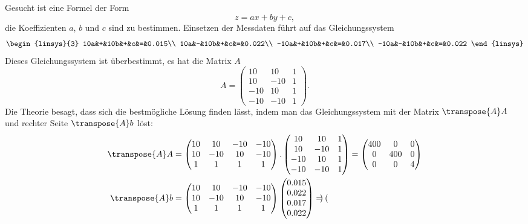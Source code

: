 \begin{loesung}
\begin{teilaufgaben}
\item
Gesucht ist eine Formel der Form
\[
z=ax+by+c,
\]
die Koeffizienten $a$, $b$ und $c$ sind zu bestimmen. Einsetzen der Messdaten
führt auf das Gleichungssystem
\[
\begin{linsys}{3}
 10a&+&10b&+&c&=&0.015\\
 10a&-&10b&+&c&=&0.022\\
-10a&+&10b&+&c&=&0.017\\
-10a&-&10b&+&c&=&0.022
\end{linsys}
\]
Dieses Gleichungssystem ist überbestimmt, es hat die Matrix $A$
\[
A
=
\begin{pmatrix}
 10& 10&1\\
 10&-10&1\\
-10& 10&1\\
-10&-10&1
\end{pmatrix}.
\]
Die Theorie besagt, dass sich die bestmögliche Lösung finden lässt,
indem man das Gleichungssystem mit der Matrix $\transpose{A}A$ und rechter Seite
$\transpose{A}b$ löst:
\begin{align*}
\transpose{A}A
&=
\begin{pmatrix}
 10& 10&-10&-10\\
 10&-10& 10&-10\\
  1&  1&  1&  1
\end{pmatrix}.
\begin{pmatrix}
 10& 10&1\\
 10&-10&1\\
-10& 10&1\\
-10&-10&1
\end{pmatrix}
=
\begin{pmatrix}
400&  0&  0\\
  0&400&  0\\
  0&  0&  4
\end{pmatrix}
\\
\transpose{A}b
&=
\begin{pmatrix}
 10& 10&-10&-10\\
 10&-10& 10&-10\\
  1&  1&  1&  1
\end{pmatrix}
\begin{pmatrix}
0.015\\0.022\\0.017\\0.022
\end{pmatrix}
=
\begin{pmatrix}

\end{pmatrix}
\end{align*}
\end{teilaufgaben}
\end{loesung}
